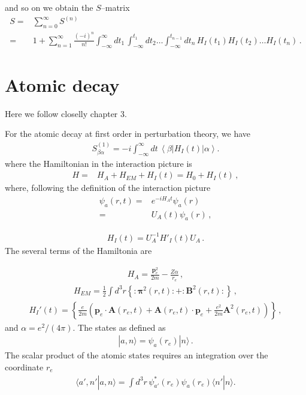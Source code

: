 and so on we obtain the $S$--matrix
\begin{align}
  S=&\sum_{n=0}^\infty S^{(n)}\nonumber\\
  =&1+\sum_{n=1}^\infty\frac{(-i)^n}{n!}\int_{-\infty}^{\infty}d t_1\,\int_{-\infty}^{t_1} d t_2\ldots\int_{-\infty}^{t_{n-1}}d t_n\,{H}_I(t_1){H}_I(t_2)\ldots{H}_I(t_n)\,.
\end{align}


\section{Atomic decay}
\label{sec:atomic-decay}

Here we follow closelly \cite{Gross:1993} chapter 3.

For the atomic decay at first order in perturbation theory, we have
\begin{align}
  S_{\beta\alpha}^{(1)}=-i \int_{-\infty}^\infty dt\, \left\langle\beta\left|H_I(t)\right|\alpha\right\rangle.
\end{align}
where the Hamiltonian in the interaction picture is
\begin{align}
  H=&H_A+H_{EM}+H_I(t)=H_0+H_I(t)\,,
\end{align}
where, following the definition of the interaction picture
\begin{align}
  \psi_a(r,t)=&e^{-i H_A t}\psi_a(r)\nonumber\\
=&U_A(t)\psi_a(r)\,,
\end{align}

\begin{align}
  H_I(t)=U_A^{-1}H'_I(t)U_A\,.
\end{align}
The several terms of the Hamiltonia are

\begin{align}
  H_A=\frac{\mathbf{p}_e^2}{2m}-\frac{Z\alpha}{r_e}\,,
\end{align}
\begin{align}
  H_{EM}=\frac{1}{2}\int d^3r\left\{:\boldsymbol{\pi}^2(r,t):+:\mathbf{B}^2(r,t):\right\}\,,
\end{align}
\begin{align}
  H_I'(t)=\left\{\frac{e}{2m}\left(\mathbf{p}_e\cdot\mathbf{A}(r_e,t)+\mathbf{A}(r_e,t)\cdot \mathbf{p}_e
+\frac{e^2}{2m}\mathbf{A}^2(r_e,t)\right)\right\}\,,
\end{align}
and $\alpha=e^2/(4\pi)$.
The states as defined as
\begin{align}
  |a,n\rangle=\psi_a(r_e)|n\rangle\,.
\end{align}
The scalar product of the atomic states requires an integration over the coordinate $r_e$
\begin{align}
  \label{eq:163f}
   \langle a',n'|a,n\rangle=\int d^3r\,\psi_{a'}^*(r_e)\psi_a(r_e)\langle n'|n\rangle.
\end{align}

